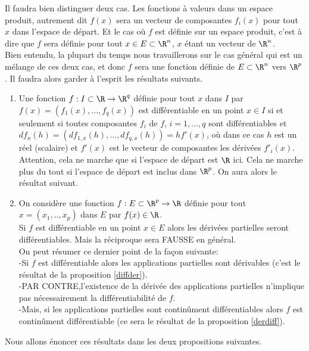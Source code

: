 \documentclass[class=report,crop=false]{standalone}
\begin{document}
 \begin{remarque*}
 
\textcolor[rgb]{0.00,0.00,1.00}{ Il faudra bien distinguer deux cas. Les fonctions à valeurs dans un espace produit, autrement 
dit $f(x)$ sera un vecteur de composantes $f_i(x)$ pour tout $x$ dans l'espace de départ.
Et le cas où $f$ est définie sur un espace produit, c'est à dire que $f$ sera définie pour tout $x \in E \subset \R^n$,
$x$ étant un vecteur de $\R^n$.\\
Bien entendu, la plupart du temps nous travaillerons sur le cas général qui est un mélange de ces deux cas, 
et donc $f$ sera une fonction définie de $E \subset \R^n$ vers $\R^p$. Il faudra alors garder à l'esprit les résultats suivants.
\begin{enumerate}
\item Une fonction $f: I \subset \R \rightarrow \R^q$ définie pour tout $x$ dans $I$ par
$f(x)=(f_1(x), ..., f_q(x))$ est différentiable en un point $x \in I$ 
si et seulement si toutes composantes $f_i$ de $f$, $i=1,...,q$ sont différentiables 
et $df_x(h)=(df_{1,x}(h),..., df_{q,x}(h))=hf'(x)$, où dans ce cas $h$ est un réel (scalaire) et $f'(x)$ est le vecteur de composantes
les dérivées $f'_i(x)$. Attention, cela ne marche que si l'espace de départ est $\R$ ici. Cela ne marche plus du tout
si l'espace de départ est inclus dans $\R^p$. On aura alors le résultat suivant.
\item On considère une fonction $f: E \subset \R^p \rightarrow \R$ définie pour tout $x=(x_1,..,x_p)$ dans $E$ par
$f(x) \in  \R$. \\
Si $f$  est différentiable en un point $x \in E$ alors les dérivées partielles seront différentiables.
Mais la réciproque sera FAUSSE en général. \\
On peut résumer ce dernier point de la façon suivante:\\
-Si $f$ est différentiable alors les applications partielles sont dérivables (c'est le résultat de la proposition \ref{diffder}).\\
-PAR CONTRE,l'existence de la dérivée des applications partielles n'implique pas nécessairement la
différentiabilité de $f$.\\
-Mais, si les applications partielles sont continûment différentiables alors 
$f$ est continûment différentiable (ce sera le résultat de la proposition \ref{derdiff}).
\end{enumerate}
Nous allons énoncer ces résultats dans les deux propositions suivantes.
}
\end{remarque*}
\end{document}
